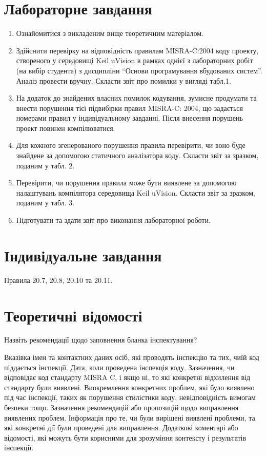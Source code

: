 \documentclass[oneside,14pt]{extarticle}
\begin{document}
\begin{normalsize}
    \section*{Лабораторне завдання}
    \begin{enumerate}
        \item Ознайомитися з викладеним вище теоретичним матеріалом. 
        \item Здійснити перевірку на відповідність правилам MISRA-C:2004 коду проекту, створеного у середовищі Keil uVision в рамках однієї з лабораторних робіт (на вибір студента) з дисципліни “Основи програмування вбудованих систем”. Аналіз провести вручну. Скласти звіт про помилки у вигляді табл.1.
        \item На додаток до знайдених власних помилок кодування, зумисне продумати та внести порушення тієї підвибірки правил MISRA-C: 2004, що задається номерами правил у індивідуальному завданні. Після внесення порушень проект повинен компілюватися.
        \item Для кожного згенерованого порушення правила перевірити, чи воно буде знайдене за допомогою статичного аналізатора коду. Скласти звіт за зразком, поданим у табл. 2.
        \item Перевірити, чи порушення правила може бути виявлене за допомогою налаштувань компілятора середовища Keil uVision. Скласти звіт за зразком, поданим у табл. 3.
        \item Підготувати та здати звіт про виконання лабораторної роботи.
    \end{enumerate}
    
    \section*{Індивідуальне завдання}
    Правила 20.7, 20.8, 20.10 та 20.11.

    \section*{Теоретичні відомості}
    Назвіть рекомендації щодо заповнення бланка інспектування?
    
        Вказівка імен та контактних даних осіб, які проводять інспекцію та тих, чиїй код піддається інспекції.
    Дата, коли проведена інспекція коду.
    Зазначення, чи відповідає код стандарту MISRA C, і якщо ні, то які конкретні відхилення від стандарту були виявлені.
    Виокремлення конкретних проблем, які було виявлено під час інспекції, таких як порушення стилістики коду, невідповідність вимогам безпеки тощо.
    Зазначення рекомендацій або пропозицій щодо виправлення виявлених проблем.
    Інформація про те, чи були вирішені виявлені проблеми, та які конкретні дії були проведені для виправлення.
    Додаткові коментарі або відомості, які можуть бути корисними для зрозуміння контексту і результатів інспекції.


\end{normalsize}
\end{document}
